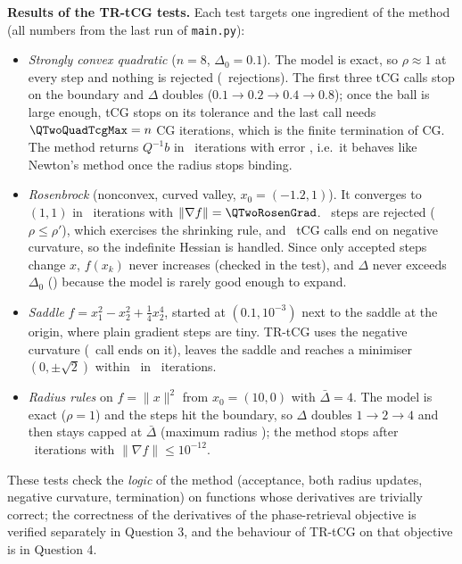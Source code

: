\documentclass[10pt,a4paper]{article}
\newcommand{\code}[1]{\texttt{#1}}
\begin{document}
\textbf{Results of the TR-tCG tests.} Each test targets one ingredient of the method (all numbers from the last run of \code{main.py}):
\begin{itemize}\itemsep0pt
\item \emph{Strongly convex quadratic} ($n=8$, $\Delta_0=0.1$). The model is exact, so $\rho\approx1$ at every step and nothing is rejected (\QTwoQuadRejected\ rejections). The first three tCG calls stop on the boundary and
$\Delta$ doubles ($0.1\to0.2\to0.4\to0.8$); once the ball is large enough, tCG stops on its tolerance and the last call needs $\QTwoQuadTcgMax=n$ CG iterations, which is the finite termination of CG. The method returns $Q^{-1}b$ in \QTwoQuadIters\ iterations with error \QTwoQuadErr, i.e.\ it behaves like Newton's method once the radius stops binding.
\item \emph{Rosenbrock} (nonconvex, curved valley, $x_0=(-1.2,1)$). It converges to $(1,1)$ in \QTwoRosenIters\ iterations with $\|\nabla f\|=\QTwoRosenGrad$. \QTwoRosenRejected\ steps are rejected ($\rho\le\rho'$), which exercises the shrinking rule, and \QTwoRosenNegCurv\ tCG calls end on negative curvature, so the indefinite Hessian is handled. Since only accepted steps change $x$, $f(x_k)$ never increases (checked in the test), and $\Delta$ never exceeds $\Delta_0$ (\QTwoRosenDeltaMax) because the model is rarely good enough to expand.
\item \emph{Saddle} $f=x_1^2-x_2^2+\frac14x_2^4$, started at $(0.1,10^{-3})$ next to the saddle at the origin, where plain gradient steps are tiny. TR-tCG uses the negative curvature (\QTwoSaddleNegCurv\ call ends on it), leaves the saddle and reaches a minimiser $(0,\pm\sqrt2)$ within \QTwoSaddleDist\ in \QTwoSaddleIters\ iterations.
\item \emph{Radius rules} on $f=\|x\|^2$ from $x_0=(10,0)$ with $\bar\Delta=4$. The model is exact ($\rho=1$) and the steps hit the boundary, so $\Delta$ doubles $1\to2\to4$ and then stays capped at $\bar\Delta$ (maximum radius \QTwoBallDeltaMax); the method stops after \QTwoBallIters\ iterations with $\|\nabla f\|\le10^{-12}$.
\end{itemize}
These tests check the \emph{logic} of the method (acceptance, both radius updates, negative curvature, termination) on functions whose derivatives are trivially correct; the correctness of the derivatives of the phase-retrieval objective is verified separately in Question 3, and the behaviour of TR-tCG on that objective is in Question 4.
\end{document}
